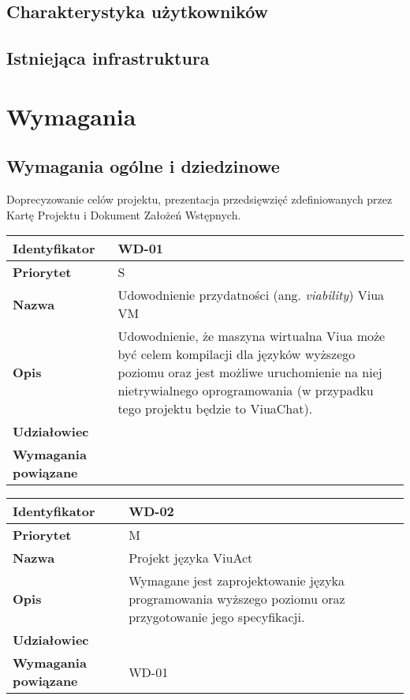 \documentclass[11pt,oneside,a4paper,titlepage,onecolumn]{article}
\begin{document}
\subsection{Charakterystyka użytkowników}

\subsection{Istniejąca infrastruktura}

\section{Wymagania}

\subsection{Wymagania ogólne i dziedzinowe}

Doprecyzowanie celów projektu, prezentacja przedsięwzięć zdefiniowanych przez Kartę Projektu i
Dokument Założeń Wstępnych.

\vspace{1em}

\begin{tabular}{ | l | l | }
    \hline
    \textbf{Identyfikator} & \parbox[t]{11cm}{WD-01} \\
    \hline
    \textbf{Priorytet} & S \\
    \hline
    \textbf{Nazwa} & Udowodnienie przydatności (ang. \emph{viability}) Viua VM \\
    \hline
    \textbf{Opis} & \parbox[t]{11cm}{
        Udowodnienie, że maszyna wirtualna Viua może być celem kompilacji dla
        języków wyższego poziomu oraz jest możliwe uruchomienie na niej nietrywialnego
        oprogramowania (w przypadku tego projektu będzie to ViuaChat).} \\
    \hline
    \textbf{Udziałowiec} & \phantom{} \\
    \hline
    \textbf{Wymagania powiązane} & \phantom{} \\
    \hline
\end{tabular}

\vspace{1em}

\begin{tabular}{ | l | l | }
    \hline
    \textbf{Identyfikator} & \parbox[t]{11cm}{WD-02} \\
    \hline
    \textbf{Priorytet} & M \\
    \hline
    \textbf{Nazwa} & Projekt języka ViuAct \\
    \hline
    \textbf{Opis} & \parbox[t]{11cm}{
        Wymagane jest zaprojektowanie języka programowania wyższego poziomu oraz przygotowanie
        jego specyfikacji.
    } \\
    \hline
    \textbf{Udziałowiec} & \phantom{} \\
    \hline
    \textbf{Wymagania powiązane} & WD-01 \\
    \hline
\end{tabular}
\end{document}

